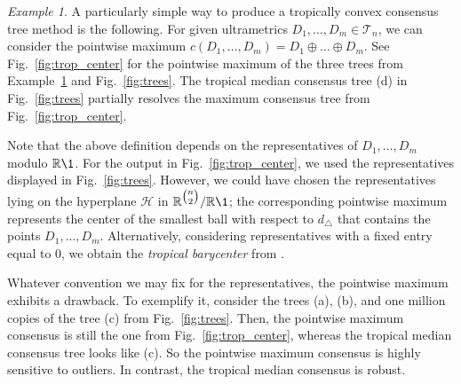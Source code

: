 \documentclass[a4paper,12pt]{amsart}
\newcommand\RR{{\mathbb R}}
\newcommand\cH{{\mathcal H}}
\newcommand\cT{{\mathcal T}}
\newcommand\torus[1]{\RR^{#1}/\RR\1} %
\DeclareMathOperator{\FW}{FW} %
\theoremstyle{remark}
\newtheorem{example}[theorem]{Example}
\begin{document}
\begin{example} \label{exmp:trop_center}
  A particularly simple way to produce a tropically convex consensus tree method is the following.
  For given ultrametrics $D_1,\dots, D_m\in\cT_n$, we can consider the pointwise maximum $c(D_1,\dots,D_m)=D_1\oplus\dots\oplus D_m$.
  See Fig.~\ref{fig:trop_center} for the pointwise maximum of the three trees from Example~\ref{exmp:trop_center} and Fig.~\ref{fig:trees}.
  The tropical median consensus tree (d) in Fig.~\ref{fig:trees} partially resolves the maximum consensus tree from Fig.~\ref{fig:trop_center}.
	
  Note that the above definition depends on the representatives of $D_1,\dots,D_m$ modulo $\RR\1$.
  For the output in Fig.~\ref{fig:trop_center}, we used the representatives displayed in Fig.~\ref{fig:trees}.
  However, we could have chosen the representatives lying on the hyperplane $\cH$ in $\torus{\tbinom{n}{2}}$; the corresponding pointwise maximum represents the center of the smallest ball with respect to $d_\triangle$ that contains the points $D_1,\dots,D_m$.
  Alternatively, considering representatives with a fixed entry equal to 0, we obtain the \emph{tropical barycenter} from \cite[\S3.2]{ABGJ:2018}.

  Whatever convention we may fix for the representatives, the pointwise maximum exhibits a drawback.
  To exemplify it, consider the trees (a), (b), and one million copies of the tree (c) from Fig.~\ref{fig:trees}.
  Then, the pointwise maximum consensus is still the one from Fig.~\ref{fig:trop_center}, whereas the tropical median consensus tree looks like (c).
  So the pointwise maximum consensus is highly sensitive to outliers.
  In contrast, the tropical median consensus is robust.
\end{example}

\end{document}
